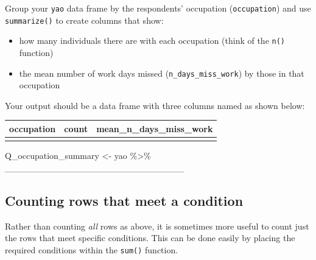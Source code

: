 \documentclass[
  letterpaper,
  DIV=11,
  numbers=noendperiod]{scrreprt}
\newenvironment{Shaded}{\begin{snugshade}}{\end{snugshade}}
\newcommand{\NormalTok}[1]{\textcolor[rgb]{0.00,0.23,0.31}{#1}}
\newcommand{\OtherTok}[1]{\textcolor[rgb]{0.00,0.23,0.31}{#1}}
\newcommand{\SpecialCharTok}[1]{\textcolor[rgb]{0.37,0.37,0.37}{#1}}
\providecommand{\tightlist}{%
  \setlength{\itemsep}{0pt}\setlength{\parskip}{0pt}}\usepackage{longtable,booktabs,array}
\begin{document}
\begin{tcolorbox}[enhanced jigsaw, title=\textcolor{quarto-callout-tip-color}{\faLightbulb}\hspace{0.5em}{Practice}, colbacktitle=quarto-callout-tip-color!10!white, leftrule=.75mm, arc=.35mm, opacityback=0, bottomrule=.15mm, rightrule=.15mm, toptitle=1mm, breakable, toprule=.15mm, colback=white, coltitle=black, colframe=quarto-callout-tip-color-frame, bottomtitle=1mm, titlerule=0mm, left=2mm, opacitybacktitle=0.6]

Group your \texttt{yao} data frame by the respondents' occupation
(\texttt{occupation}) and use \texttt{summarize()} to create columns
that show:

\begin{itemize}
\tightlist
\item
  how many individuals there are with each occupation (think of the
  \texttt{n()} function)
\item
  the mean number of work days missed (\texttt{n\_days\_miss\_work}) by
  those in that occupation
\end{itemize}

Your output should be a data frame with three columns named as shown
below:

\begin{longtable}[]{@{}lll@{}}
\toprule\noalign{}
occupation & count & mean\_n\_days\_miss\_work \\
\midrule\noalign{}
\endhead
\bottomrule\noalign{}
\endlastfoot
& & \\
\end{longtable}

\begin{Shaded}
\begin{Highlighting}[]
\NormalTok{Q\_occupation\_summary }\OtherTok{\textless{}{-}} 
\NormalTok{  yao }\SpecialCharTok{\%\textgreater{}\%}
\NormalTok{  \_\_\_\_\_\_\_\_\_\_\_\_\_\_\_\_\_\_\_\_\_\_\_\_\_\_\_\_}
\end{Highlighting}
\end{Shaded}

\end{tcolorbox}

\subsection{Counting rows that meet a
condition}\label{counting-rows-that-meet-a-condition}

Rather than counting \emph{all} rows as above, it is sometimes more
useful to count just the rows that meet specific conditions. This can be
done easily by placing the required conditions within the \texttt{sum()}
function.
\end{document}
